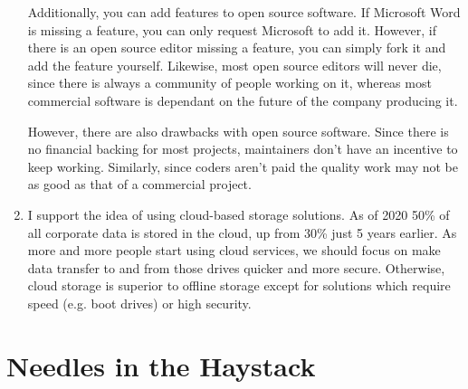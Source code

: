 \documentclass{scrartcl}
\begin{document}
\begin{enumerate}
Additionally, you can add features to open source software. If Microsoft Word is
missing a feature, you can only request Microsoft to add it. However, if
there is an open source editor missing a feature, you can simply fork it and
add the feature yourself. Likewise, most open source editors will never die,
since there is always a community of people working on it, whereas most
commercial software is dependant on the future of the company producing it.

However, there are also drawbacks with open source software. Since there is
no financial backing for most projects, maintainers don't have an incentive
to keep working. Similarly, since coders aren't paid the quality work may not
be as good as that of a commercial project.

\item I support the idea of using cloud-based storage solutions. As of 2020 50\% of all
corporate data is stored in the cloud, up from 30\% just 5 years earlier. As
more and more people start using cloud services,  we should focus on make
data transfer to and from those drives quicker and more secure. Otherwise,
cloud storage is superior to offline storage except for solutions which
require speed (e.g. boot drives) or high security.
\end{enumerate}

\section{Needles in the Haystack}
\label{sec:orgaef6557}
\end{document}

